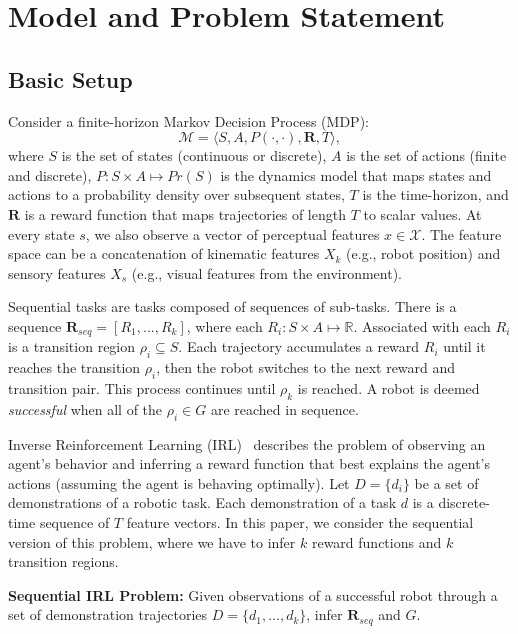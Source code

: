 \section{Model and Problem Statement}

\subsection{Basic Setup}
Consider a finite-horizon Markov Decision Process (MDP): \[\mathcal{M} = \langle S,A,P(\cdot,\cdot),\mathbf{R},T \rangle,\] where $S$ is the set of states (continuous or discrete), $A$ is the set of actions (finite and discrete), $P: S \times A \mapsto Pr(S)$ is the dynamics model that maps states and actions to a probability density over subsequent states, $T$ is the time-horizon, and $\mathbf{R}$ is a reward function that maps trajectories of length $T$ to scalar values. At every state $s$, we also observe a vector of perceptual features $x \in \mathcal{X}$.
The feature space can be a concatenation of kinematic features $X_{k}$ (e.g., robot position) and sensory features $X_{s}$ (e.g., visual features from the environment).

Sequential tasks are tasks composed of sequences of sub-tasks. There is a sequence $\mathbf{R}_{seq}=[R_1,...,R_k]$, where each $R_i: S \times A \mapsto \mathbb{R}$. Associated with each $R_i$ is a transition region $\rho_i \subseteq S$. 
Each trajectory accumulates a reward $R_i$ until it reaches the transition $\rho_i$, then the robot switches to the next reward and transition pair.
This process continues until $\rho_k$ is reached.
A robot is deemed \emph{successful} when all of the $\rho_i \in G$ are reached in sequence.

Inverse Reinforcement Learning (IRL)~\cite{ng2000algorithms} describes the problem of observing an agent's behavior and inferring a reward function that best explains the agent's actions (assuming the agent is behaving optimally).
Let $D=\{d_i\}$ be a set of demonstrations of a robotic task.
Each demonstration of a task $d$ is a discrete-time sequence of $T$ feature vectors.
In this paper, we consider the sequential version of this problem, where we have to infer $k$ reward functions and $k$ transition regions.

\vspace{0.5em} \noindent \textbf{Sequential IRL Problem: } Given observations of a successful robot through a set of demonstration trajectories $D = \{d_1,...,d_k\}$, infer $\mathbf{R}_{seq}$ and $G$.
\vspace{0.5em}

